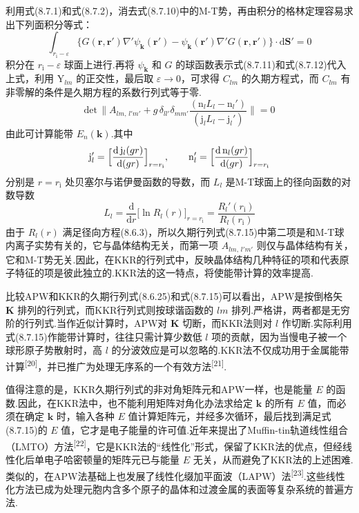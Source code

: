 利用式(8.7.1)和式(8.7.2)，消去式(8.7.10)中的M-T势，再由积分的格林定理容易求出下列面积分等式：
\begin{equation}
  \int_{r_{\mathrm{i}}-\varepsilon}\bigl\{G(\boldsymbol{r},\boldsymbol{r}')\nabla'\psi_{\boldsymbol{k}}(\boldsymbol{r}')
  -\psi_{\boldsymbol{k}}(\boldsymbol{r}')\nabla'G(\boldsymbol{r},\boldsymbol{r}')\bigr\}\cdot\mathrm{d}\boldsymbol{S}'=0
\end{equation}
积分在 $r_{\mathrm{i}}-\varepsilon$ 球面上进行.再将 $\psi_{\boldsymbol{k}}$ 和 $G$ 的球函数表示式(8.7.11)和式(8.7.12)代入上式，利用 $\mathrm{Y}_{lm}$ 的正交性，最后取 $\varepsilon\to 0$，可求得 $C_{lm}$ 的久期方程式，而 $C_{lm}$ 有非零解的条件是久期方程的系数行列式等于零.
\begin{equation}
  \mathrm{det}\,\biggl\|A_{lm,\,l'm'}
  +g\,\delta_{ll'}\delta_{mm'}\frac{(\mathrm{n}_{l}L_{l}-\mathrm{n}_{l}')}{(\mathrm{j}_{l}L_{l}-\mathrm{j}_{l}')}\biggr\|=0
\end{equation}
由此可计算能带 $E_{n}(\boldsymbol{k})$.其中
\begin{equation*}
  \mathrm{j}_{l}'=\Bigl[\frac{\mathrm{d}\,\mathrm{j}_{l}(gr)}{\mathrm{d}(gr)}\Bigr]_{r=r_{\mathrm{i}}},\qquad
  \mathrm{n}_{l}'=\Bigl[\frac{\mathrm{d}\,\mathrm{n}_{l}(gr)}{\mathrm{d}(gr)}\Bigr]_{r=r_{\mathrm{i}}}
\end{equation*}
分别是 $r=r_{\mathrm{i}}$ 处贝塞尔与诺伊曼函数的导数，而 $L_{l}$ 是M-T球面上的径向函数的对数导数
\begin{equation}
  L_{l}=\frac{\mathrm{d}}{\mathrm{d}r}\bigl[\ln R_{l}(r)\bigr]_{r=r_{\mathrm{i}}}
  =\frac{R_{l}'(r_{\mathrm{i}})}{R_{l}(r_{\mathrm{i}})}
\end{equation}
由于 $R_{l}(r)$ 满足径向方程(8.6.3)，所以久期行列式(8.7.15)中第二项是和M-T球内离子实势有关的，它与晶体结构无关，而第一项 $A_{lm,\,l'm'}$ 则仅与晶体结构有关，它和M-T势无关.因此，在KKR的行列式中，反映晶体结构几种特征的项和代表原子特征的项是彼此独立的.KKR法的这一特点，将使能带计算的效率提高.

比较APW和KKR的久期行列式(8.6.25)和式(8.7.15)可以看出，APW是按倒格矢 $\boldsymbol{K}$ 排列的行列式，而KKR行列式则按球谐函数的 $lm$ 排列.严格讲，两者都是无穷阶的行列式.当作近似计算时，APW对 $\boldsymbol{K}$ 切断，而KKR法则对 $l$ 作切断.实际利用式(8.7.15)作能带计算时，往往只需计算少数低 $l$ 项的贡献，因为当慢电子被一个球形原子势散射时，高 $l$ 的分波效应是可以忽略的.KKR法不仅成功用于金属能带计算\textsuperscript{[20]}，并已推广为处理无序系的一个有效方法\textsuperscript{[21]}.

值得注意的是，KKR久期行列式的非对角矩阵元和APW一样，也是能量 $E$ 的函数.因此，在KKR法中，也不能利用矩阵对角化办法求给定 $\boldsymbol{k}$ 的所有 $E$ 值，而必须在确定 $\boldsymbol{k}$ 时，输入各种 $E$ 值计算矩阵元，并经多次循环，最后找到满足式(8.7.15)的 $E$ 值，它才是电子能量的许可值.近年来提出了Muffin-tin轨道线性组合（LMTO）方法\textsuperscript{[22]}，它是KKR法的“线性化”形式，保留了KKR法的优点，但经线性化后单电子哈密顿量的矩阵元已与能量 $E$ 无关，从而避免了KKR法的上述困难.类似的，在APW法基础上也发展了线性化缀加平面波（LAPW）法\textsuperscript{[23]}.这些线性化方法已成为处理元胞内含多个原子的晶体和过渡金属的表面等复杂系统的普遍方法.
